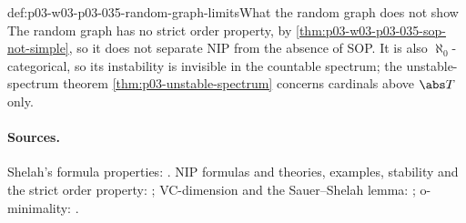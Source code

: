 \begin{hbwarning}{def:p03-w03-p03-035-random-graph-limits}{What the random graph does not show}
The random graph has no strict order property, by
\cref{thm:p03-w03-p03-035-sop-not-simple}, so it does not separate NIP from
the absence of SOP.  It is also \(\aleph_0\)-categorical, so its instability
is invisible in the countable spectrum; the unstable-spectrum theorem
\cref{thm:p03-unstable-spectrum} concerns cardinals above \(\abs T\) only.
\end{hbwarning}

\paragraph{Sources.}
Shelah's formula properties: \cite[\S\S 2--4]{Shelah1971Stability}.
NIP formulas and theories, examples, stability and the strict order property:
\cite[Sections~2.1, 2.3.2--2.3.4, pp.~13--36]{Simon2015GuideManuscript};
VC-dimension and the Sauer--Shelah lemma:
\cite[Section~6.1, pp.~85--87]{Simon2015GuideManuscript}; o-minimality:
\cite[Section~A.1.3, pp.~148--150]{Simon2015GuideManuscript}.
